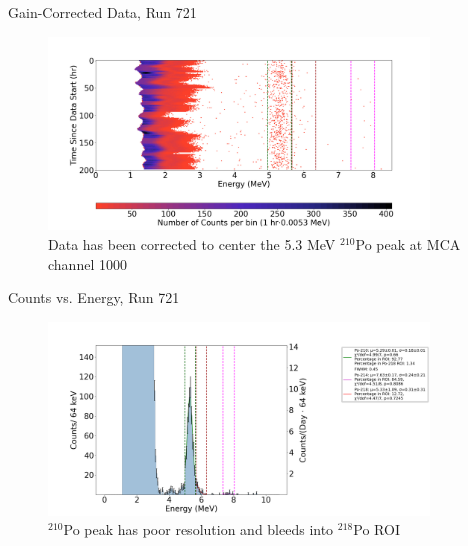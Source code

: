 \documentclass[aspectratio=169]{beamer}
\begin{document}
\begin{frame}{Gain-Corrected Data, Run 721}
    \begin{figure}
        \begin{center}
            \includegraphics[width=0.9\textwidth]
            {assets/721/CD.png}
            \caption{Data has been corrected to center the 5.3 MeV $^{210}$Po peak at MCA channel 1000}
        \end{center}
    \end{figure}
\end{frame}

\begin{frame}{Counts vs. Energy, Run 721}
    \begin{figure}
        \begin{center}
            \includegraphics[width=0.9\textwidth]
            {assets/721/CvE.png}
            \caption{$^{210}$Po peak has poor resolution and bleeds into $^{218}$Po ROI}
        \end{center}
    \end{figure}
\end{frame}
\end{document}
